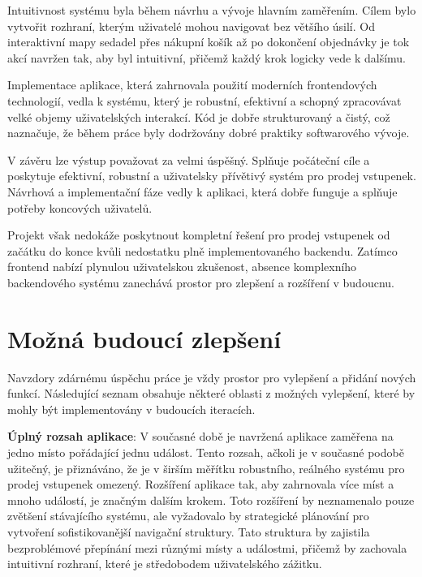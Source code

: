 Intuitivnost systému byla během návrhu a vývoje hlavním zaměřením.
Cílem bylo vytvořit rozhraní, kterým uživatelé mohou navigovat bez většího úsilí.
Od interaktivní mapy sedadel přes nákupní košík až po dokončení objednávky je tok akcí navržen tak, aby byl intuitivní, přičemž každý krok logicky vede k dalšímu.

Implementace aplikace, která zahrnovala použití moderních frontendových technologií, vedla k systému, který je robustní, efektivní a schopný zpracovávat velké objemy uživatelských interakcí.
Kód je dobře strukturovaný a čistý, což naznačuje, že během práce byly dodržovány dobré praktiky softwarového vývoje.

V závěru lze výstup považovat za velmi úspěšný.
Splňuje počáteční cíle a poskytuje efektivní, robustní a uživatelsky přívětivý systém pro prodej vstupenek.
Návrhová a implementační fáze vedly k aplikaci, která dobře funguje a splňuje potřeby koncových uživatelů.

Projekt však nedokáže poskytnout kompletní řešení pro prodej vstupenek od začátku do konce kvůli nedostatku plně implementovaného backendu.
Zatímco frontend nabízí plynulou uživatelskou zkušenost, absence komplexního backendového systému zanechává prostor pro zlepšení a rozšíření v budoucnu.


\section*{Možná budoucí zlepšení}
\label{sec:zaver-budoucnost}
Navzdory zdárnému úspěchu práce je vždy prostor pro vylepšení a přidání nových funkcí.
Následující seznam obsahuje některé oblasti z možných vylepšení, které by mohly být implementovány v budoucích iteracích.

\textbf{Úplný rozsah aplikace}: V současné době je navržená aplikace zaměřena na jedno místo pořádající jednu událost.
Tento rozsah, ačkoli je v současné podobě užitečný, je přiznáváno, že je v širším měřítku robustního, reálného systému pro prodej vstupenek omezený.
Rozšíření aplikace tak, aby zahrnovala více míst a mnoho událostí, je značným dalším krokem.
Toto rozšíření by neznamenalo pouze zvětšení stávajícího systému, ale vyžadovalo by strategické plánování pro vytvoření sofistikovanější navigační struktury.
Tato struktura by zajistila bezproblémové přepínání mezi různými místy a událostmi, přičemž by zachovala intuitivní rozhraní, které je středobodem uživatelského zážitku.

